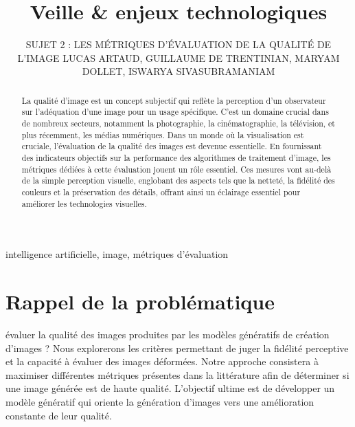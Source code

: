 \documentclass{ieeeaccess}
\begin{document}
\title{Veille \& enjeux technologiques}
\author{
\uppercase{Sujet 2 : Les métriques d'évaluation de la qualité de l'image}
\newline
\newline
\uppercase{Lucas Artaud},
\uppercase{Guillaume de Trentinian}, 
\uppercase{Maryam Dollet},
\uppercase{Iswarya Sivasubramaniam}
}
\address[1]{ESILV \& EMLV, 92400 Courbevoie, France 
(e-mail: lucas.artaud@edu.devinci.fr)}
\address[2]{ESILV, 92400 Courbevoie, France
(e-mail: guillaume.de\_trentinian@edu.devinci.fr)}
\address[3]{ESILV \& EMLV, 92400 Courbevoie, France
(e-mail: maryam.dollet@edu.devinci.fr)}
\address[4]{ESILV \& EMLV, 92400 Courbevoie, France
(e-mail: iswarya.sivasubramaniam@edu.devinci.fr)}

\begin{abstract}
La qualité d’image est un concept subjectif qui reflète la perception d’un observateur sur l’adéquation d’une image pour un usage spécifique. C’est un domaine crucial dans de nombreux secteurs, notamment la photographie, la cinématographie, la télévision, et plus récemment, les médias numériques.
Dans un monde où la visualisation est cruciale, l'évaluation de la qualité des images est devenue essentielle. En fournissant des indicateurs objectifs sur la performance des algorithmes de traitement d'image, les métriques dédiées à cette évaluation jouent un rôle essentiel. Ces mesures vont au-delà de la simple perception visuelle, englobant des aspects tels que la netteté, la fidélité des couleurs et la préservation des détails, offrant ainsi un éclairage essentiel pour améliorer les technologies visuelles.
\end{abstract}

\begin{keywords}
intelligence artificielle, image, métriques d'évaluation
\end{keywords}

\titlepgskip=-15pt

\maketitle

\section{Rappel de la problématique}
 évaluer la qualité des images produites par les modèles génératifs de création d’images ?
Nous explorerons les critères permettant de juger la fidélité perceptive et la capacité à évaluer des images déformées. Notre approche consistera à maximiser différentes métriques présentes dans la littérature afin de déterminer si une image générée est de haute qualité. L'objectif ultime est de développer un modèle génératif qui oriente la génération d'images vers une amélioration constante de leur qualité.
\end{document}
